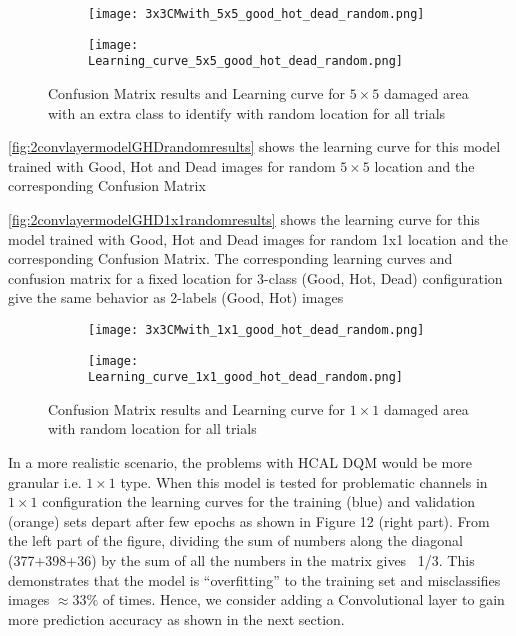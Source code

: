 \begin{figure}
	\begin{subfigure}{.5\textwidth}
 		\texttt{[image: 3x3CMwith\_5x5\_good\_hot\_dead\_random.png]}
 	\end{subfigure}
 	\begin{subfigure}{.45\textwidth}
 	\texttt{[image: Learning\_curve\_5x5\_good\_hot\_dead\_random.png]}
 	\end{subfigure}
 \caption{Confusion Matrix results and Learning curve
	 for $5\times5$ damaged area with an extra class to identify with random location for all trials\label{fig:2convlayermodelGHDrandomresults}}
 \end{figure}
 
\autoref{fig:2convlayermodelGHDrandomresults} shows the learning curve for this model trained with Good, Hot and Dead images for random $5\times5$ location and the corresponding Confusion Matrix

\autoref{fig:2convlayermodelGHD1x1randomresults} shows the learning curve for this model trained with Good, Hot and Dead images 
for random 1x1 location and the corresponding Confusion Matrix. 
The corresponding learning curves and confusion matrix for a fixed location for 3-class 
(Good, Hot, Dead) configuration give the same behavior as 2-labels (Good, Hot) images



\begin{figure}
\begin{subfigure}{.5\textwidth}
\texttt{[image: 3x3CMwith\_1x1\_good\_hot\_dead\_random.png]}
\end{subfigure}
\begin{subfigure}{.45\textwidth}
\texttt{[image: Learning\_curve\_1x1\_good\_hot\_dead\_random.png]}
\end{subfigure}
\caption{Confusion Matrix results and Learning curve for $1\times1$ damaged area with random location for all trials
 \label{fig:2convlayermodelGHD1x1randomresults}}
\end{figure}
	
	
In a more realistic scenario, the problems with HCAL DQM would be more granular i.e. $1\times1$ type. 
When this model is tested for problematic channels in $1\times1$ configuration the learning curves for the training (blue) and validation (orange) sets depart after few epochs as shown in Figure 12 (right part).
From the left part of the figure, dividing the sum of numbers along the diagonal (377+398+36) by the sum of all the numbers in the matrix gives ~1/3. This demonstrates that the model is “overfitting” to the training set and misclassifies images $\approx 33\% $ of times. Hence, we consider adding a Convolutional layer to gain more prediction accuracy as shown in the next section.	
	
